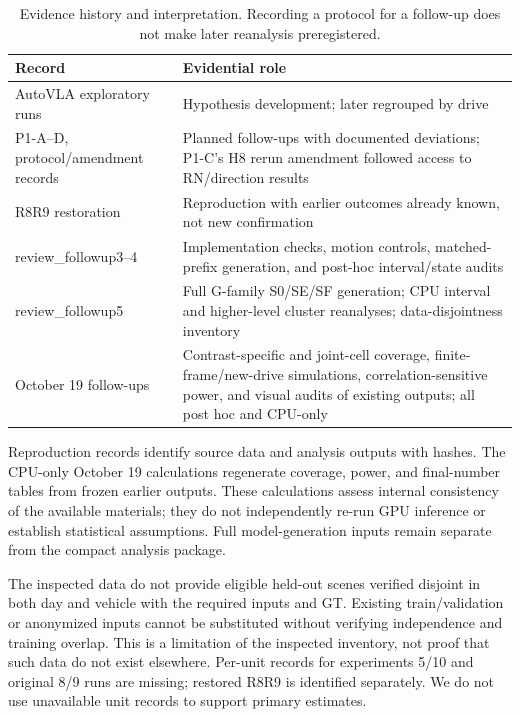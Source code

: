 \begin{table}[ht]
\centering\small
\caption{Evidence history and interpretation. Recording a protocol for a follow-up does not make later reanalysis preregistered.}
\label{tab:provenance}
\begin{tabularx}{\textwidth}{@{}l >{\raggedright\arraybackslash}X@{}}\toprule
Record & Evidential role\\\midrule
AutoVLA exploratory runs & Hypothesis development; later regrouped by drive\\
P1-A--D, protocol/amendment records & Planned follow-ups with documented deviations; P1-C's H8 rerun amendment followed access to RN/direction results\\
R8R9 restoration & Reproduction with earlier outcomes already known, not new confirmation\\
review\_followup3--4 & Implementation checks, motion controls, matched-prefix generation, and post-hoc interval/state audits\\
review\_followup5 & Full G-family S0/SE/SF generation; CPU interval and higher-level cluster reanalyses; data-disjointness inventory\\
October 19 follow-ups & Contrast-specific and joint-cell coverage, finite-frame/new-drive simulations, correlation-sensitive power, and visual audits of existing outputs; all post hoc and CPU-only\\\bottomrule
\end{tabularx}
\end{table}

Reproduction records identify source data and analysis outputs with hashes. The CPU-only October 19 calculations regenerate coverage, power, and final-number tables from frozen earlier outputs. These calculations assess internal consistency of the available materials; they do not independently re-run GPU inference or establish statistical assumptions. Full model-generation inputs remain separate from the compact analysis package.

The inspected data do not provide eligible held-out scenes verified disjoint in both day and vehicle with the required inputs and GT. Existing train/validation or anonymized inputs cannot be substituted without verifying independence and training overlap. This is a limitation of the inspected inventory, not proof that such data do not exist elsewhere. Per-unit records for experiments 5/10 and original 8/9 runs are missing; restored R8R9 is identified separately. We do not use unavailable unit records to support primary estimates.




